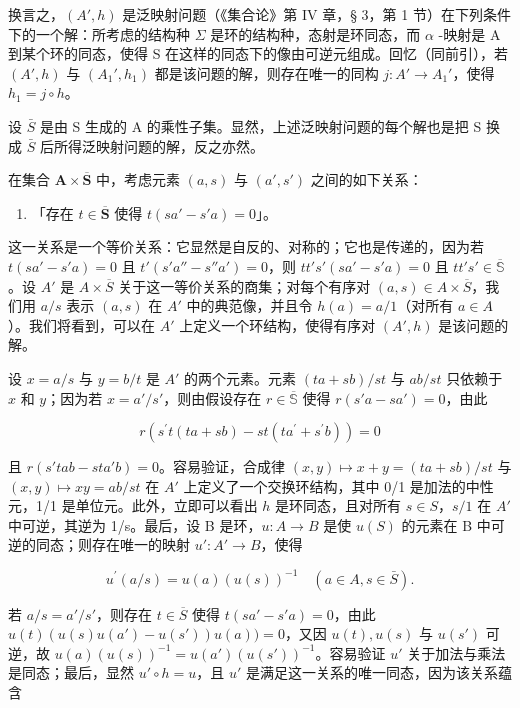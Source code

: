 换言之，\((A', h)\) 是泛映射问题（《集合论》第 IV 章，§ 3，第 1 节）在下列条件下的一个解：所考虑的结构种 \(\Sigma\) 是环的结构种，态射是环同态，而 \(\alpha\) -映射是 A 到某个环的同态，使得 S 在这样的同态下的像由可逆元组成。回忆（同前引），若 \((A', h)\) 与 \((A_{1}', h_{1})\) 都是该问题的解，则存在唯一的同构 \(j: A' \to A_{1}'\)，使得 \(h_{1} = j \circ h\)。

设 \(\bar{S}\) 是由 S 生成的 A 的乘性子集。显然，上述泛映射问题的每个解也是把 S 换成 \(\bar{S}\) 后所得泛映射问题的解，反之亦然。

在集合 \(\mathbf{A} \times \overline{\mathbf{S}}\) 中，考虑元素 \((a, s)\) 与 \((a', s')\) 之间的如下关系：

\begin{enumerate}
\def\labelenumi{(\arabic{enumi})}
\tightlist
\item
 「存在 \(t \in \overline{\mathbf{S}}\) 使得 \(t(sa' - s'a) = 0\)」。
\end{enumerate}

这一关系是一个等价关系：它显然是自反的、对称的；它也是传递的，因为若 \(t(sa' - s'a) = 0\) 且 \(t'(s'a'' - s''a') = 0\)，则 \(tt's'(sa' - s'a) = 0\) 且 \(tt's' \in \overline{\mathbb{S}}\)。设 \(A'\) 是 \(A \times \overline{S}\) 关于这一等价关系的商集；对每个有序对 \((a, s) \in A \times \overline{S}\)，我们用 \(a/s\) 表示 \((a, s)\) 在 \(A'\) 中的典范像，并且令 \(h(a) = a/1\)（对所有 \(a \in A\)）。我们将看到，可以在 \(A'\) 上定义一个环结构，使得有序对 \((A', h)\) 是该问题的解。

设 \(x = a / s\) 与 \(y = b / t\) 是 \(A'\) 的两个元素。元素 \((ta + sb) / st\) 与 \(ab / st\) 只依赖于 \(x\) 和 \(y\)；因为若 \(x = a' / s'\)，则由假设存在 \(r \in \overline{\mathbb{S}}\) 使得 \(r(s'a - sa') = 0\)，由此

\[
r \left(s ^ {\prime} t (t a + s b) - s t \left(t a ^ {\prime} + s ^ {\prime} b\right)\right) = 0
\]

且 \(r(s'tab - sta'b) = 0\)。容易验证，合成律 \((x,y) \mapsto x + y = (ta + sb)/st\) 与 \((x,y) \mapsto xy = ab/st\) 在 \(A'\) 上定义了一个交换环结构，其中 0/1 是加法的中性元，1/1 是单位元。此外，立即可以看出 \(h\) 是环同态，且对所有 \(s \in S\)，\(s/1\) 在 \(A'\) 中可逆，其逆为 1/s。最后，设 B 是环，\(u: A \to B\) 是使 \(u(S)\) 的元素在 B 中可逆的同态；则存在唯一的映射 \(u': A' \to B\)，使得

\[
u ^ {\prime} (a / s) = u (a) (u (s)) ^ {- 1} \quad (a \in A, s \in \bar {S}).\tag{2}
\]

若 \(a / s = a' / s'\)，则存在 \(t \in \overline{S}\) 使得 \(t(sa' - s'a) = 0\)，由此 \(u(t)(u(s)u(a') - u(s'))u(a)) = 0\)，又因 \(u(t), u(s)\) 与 \(u(s')\) 可逆，故 \(u(a)(u(s))^{-1} = u(a')(u(s'))^{-1}\)。容易验证 \(u'\) 关于加法与乘法是同态；最后，显然 \(u' \circ h = u\)，且 \(u'\) 是满足这一关系的唯一同态，因为该关系蕴含

